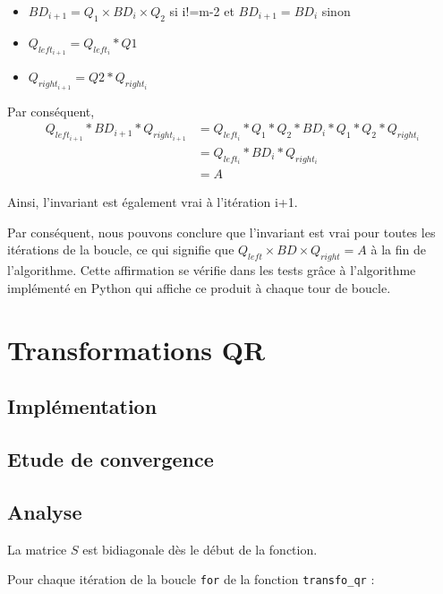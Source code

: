 \documentclass{article}
\begin{document}
\begin{itemize}
  \item $BD_{i+1} = Q_{1} \times BD_{i} \times Q_{2}$ si i!=m-2 et $BD_{i+1} = BD_{i}$ sinon
  \item $Q_{left_{i+1}} = Q_{left_{i}} * Q1$
  \item $Q_{right_{i+1}} = Q2 * Q_{right_{i}}$
\end{itemize}

Par conséquent,
\begin{align}
  Q_{left_{i+1}} * BD_{i+1} * Q_{right_{i+1}} &= Q_{left_{i}} * Q_1 * Q_2 * BD_{i} * Q_1 * Q_2 * Q_{right_{i}} \\
                                          &= Q_{left_{i}} * BD_{i} * Q_{right_{i}} \\
                                          &= A
\end{align}


Ainsi, l'invariant est également vrai à l'itération i+1.

Par conséquent, nous pouvons conclure que l'invariant est vrai pour toutes les itérations de la boucle, ce qui signifie que $Q_{left} \times BD \times Q_{right} = A$ à la fin de l'algorithme.
Cette affirmation se vérifie dans les tests grâce à l'algorithme implémenté en Python qui affiche ce produit à chaque tour de boucle.

\section{Transformations QR}
\label{sec:transfo_qr}

\subsection{Implémentation}
\label{ssec:implem_qr}

\subsection{Etude de convergence}
\label{ssec:conv_qr}

\subsection{Analyse}
\label{ssec:analyse_qr}

La matrice $S$ est bidiagonale dès le début de la fonction.

Pour chaque itération de la boucle \verb|for| de la fonction \verb|transfo_qr| :
\smallskip
\end{document}
